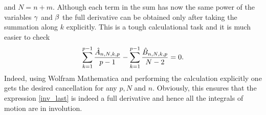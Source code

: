 \documentclass[12pt]{article}%
\numberwithin{equation}{section}
\begin{document}
and $N=n+m$. Although each term in the sum has now the same power of the variables $\gamma$ and $\beta$ the full derivative can be obtained only after taking the summation along $k$ explicitly. This is a tough calculational task and it is much easier to check
\begin{equation}
\sum_{k=1}^{p-1}\frac{\hat{A}_{n,N,k,p}}{p-1}-\sum_{k=1}^{p-1}\frac{\hat{B}_{n,N,k,p}}{N-2}=0.
\end{equation}
Indeed, using Wolfram Mathematica and performing the calculation explicitly one gets the desired cancellation for any $p,N$ and $n$. Obviously, this ensures that the expression \eqref{inv_last} is indeed a full derivative and hence all the integrals of motion are in involution.



\end{document}
